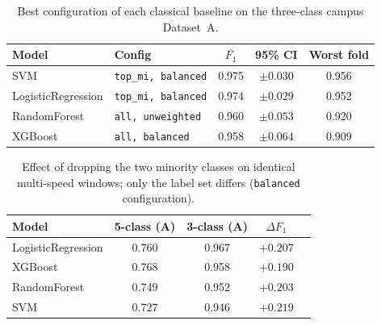 \vspace{-6mm}
\begin{table}[H]
\centering
\caption{Best configuration of each classical baseline on the three-class campus Dataset~A.}
\label{tab:campus_A_3class}
\begin{tabular}{llccc}
\toprule
\textbf{Model} & \textbf{Config} & $\overline{F_1}$ & 95\% CI &
\textbf{Worst fold} \\
\midrule
SVM                & \texttt{top\_mi, balanced}    & 0.975 & $\pm 0.030$ & 0.956 \\
LogisticRegression & \texttt{top\_mi, balanced}    & 0.974 & $\pm 0.029$ & 0.952 \\
RandomForest       & \texttt{all, unweighted}      & 0.960 & $\pm 0.053$ & 0.920 \\
XGBoost            & \texttt{all, balanced}        & 0.958 & $\pm 0.064$ & 0.909 \\
\bottomrule
\end{tabular}
\end{table}

\vspace{-6mm}
\begin{table}[H]
\centering
\caption{Effect of dropping the two minority classes on identical multi-speed windows; only the label set differs (\texttt{balanced} configuration).}
\label{tab:campus_5cls_to_3cls_delta}
\begin{tabular}{lcccc}
\toprule
\textbf{Model} & \textbf{5-class (A)} & \textbf{3-class (A)} & $\Delta F_1$ \\
\midrule
LogisticRegression & 0.760 & 0.967 & $+0.207$ \\
XGBoost            & 0.768 & 0.958 & $+0.190$ \\
RandomForest       & 0.749 & 0.952 & $+0.203$ \\
SVM                & 0.727 & 0.946 & $+0.219$ \\
\bottomrule
\end{tabular}
\end{table}
\vspace{-6mm}

